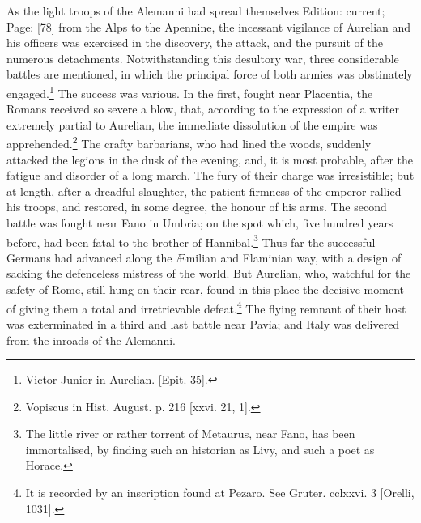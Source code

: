 As the light troops of the Alemanni had spread themselves Edition: current; Page: [78] from the Alps to the Apennine, the incessant vigilance of Aurelian and his officers was exercised in the discovery, the attack, and the pursuit of the numerous detachments. Notwithstanding this desultory war, three considerable battles are mentioned, in which the principal force of both armies was obstinately engaged.\footnote{Victor Junior in Aurelian. [Epit. 35].} The success was various. In the first, fought near Placentia, the Romans received so severe a blow, that, according to the expression of a writer extremely partial to Aurelian, the immediate dissolution of the empire was apprehended.\footnote{Vopiscus in Hist. August. p. 216 [xxvi. 21, 1].} The crafty barbarians, who had lined the woods, suddenly attacked the legions in the dusk of the evening, and, it is most probable, after the fatigue and disorder of a long march. The fury of their charge was irresistible; but at length, after a dreadful slaughter, the patient firmness of the emperor rallied his troops, and restored, in some degree, the honour of his arms. The second battle was fought near Fano in Umbria; on the spot which, five hundred years before, had been fatal to the brother of Hannibal.\footnote{The little river or rather torrent of Metaurus, near Fano, has been immortalised, by finding such an historian as Livy, and such a poet as Horace.} Thus far the successful Germans had advanced along the Æmilian and Flaminian way, with a design of sacking the defenceless mistress of the world. But Aurelian, who, watchful for the safety of Rome, still hung on their rear, found in this place the decisive moment of giving them a total and irretrievable defeat.\footnote{It is recorded by an inscription found at Pezaro. See Gruter. cclxxvi. 3 [Orelli, 1031].} The flying remnant of their host was exterminated in a third and last battle near Pavia; and Italy was delivered from the inroads of the Alemanni.

